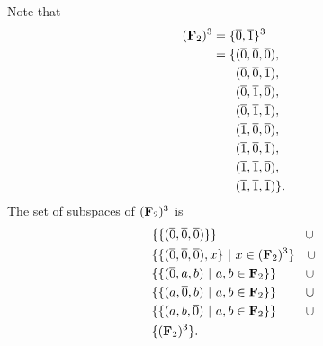Note that
\begin{align*}
  (\mathbf{F}_2)^3 = \{&\overline 0, \overline 1\}^3\\
           = \{&(\overline 0, \overline 0, \overline 0),\\
               &(\overline 0, \overline 0, \overline 1),\\
               &(\overline 0, \overline 1, \overline 0),\\
               &(\overline 0, \overline 1, \overline 1),\\
               &(\overline 1, \overline 0, \overline 0),\\
               &(\overline 1, \overline 0, \overline 1),\\
               &(\overline 1, \overline 1, \overline 0),\\
               &(\overline 1, \overline 1, \overline 1)\}.
\end{align*}
The set of subspaces of $(\mathbf{F}_2)^3$ is
\begin{align*}
  &\{\{(\overline 0, \overline 0, \overline 0)\}\} ~~~~~~~~~~~~~~~~~~~~~ \cup\\
  &\{\{(\overline 0, \overline 0, \overline 0), x\} ~|~ x \in (\mathbf{F}_2)^3\} ~~~ \cup\\
  &\{\{(\overline 0, a, b) ~|~ a, b \in \mathbf{F}_2\}\}  ~~~~~~~ \cup\\
  &\{\{(a, \overline 0, b) ~|~ a, b \in \mathbf{F}_2\}\}  ~~~~~~~ \cup\\
  &\{\{(a, b, \overline 0) ~|~ a, b \in \mathbf{F}_2\}\}  ~~~~~~~ \cup\\
  &\{(\mathbf{F}_2)^3\}.
\end{align*}


\newpage

